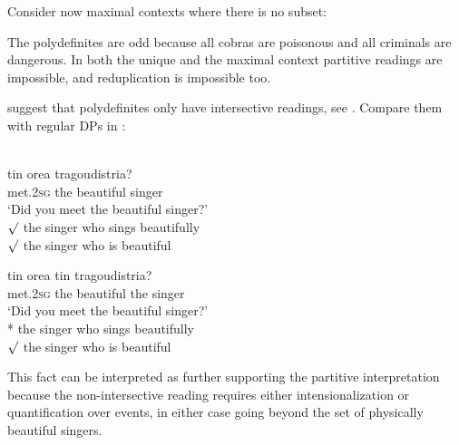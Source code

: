 \documentclass[output=paper,
modfonts
]{langscibook}
\begin{document}
Consider now maximal contexts where there is no subset:

\z

\z

The polydefinites are odd because all cobras are poisonous and all criminals are dangerous. In both the unique and the maximal context partitive readings are impossible, and reduplication is impossible too.

\citet{CamposStravrou2004} suggest that polydefinites only have intersective readings, see . Compare them with regular DPs in :

\ea\label{ex:etxeberria:48}  \\
\ea\label{ex:etxeberria:48a}
 {tin} {orea} {tragoudistria}?\\
met.\textsc{2sg} the beautiful singer\\
\glt `Did you meet the beautiful singer?'\\
$\surd$ the singer who sings beautifully\\
$\surd$ the singer who is beautiful

\ex\label{ex:etxeberria:48b}
 {tin} {orea} {tin} {tragoudistria}?\\
met.\textsc{2sg} the beautiful the singer\\
\glt `Did you meet the beautiful singer?'\\ 
* the singer who sings beautifully\\
$\surd$ the singer who is beautiful
\z
\z

This fact can be interpreted as further supporting the partitive interpretation because the non-intersective reading requires either intensionalization or quantification over events, in either case going beyond the set of physically beautiful singers.
\end{document}
